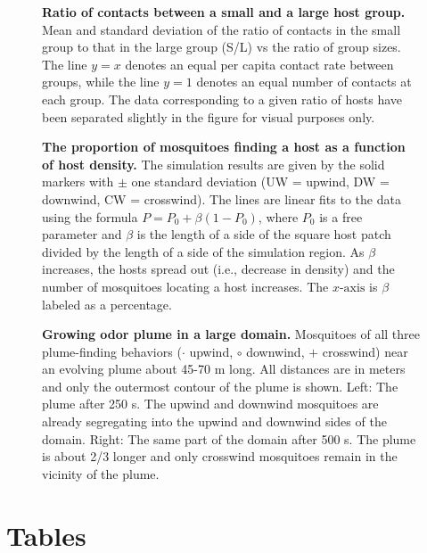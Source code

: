 \documentclass[10pt]{article}
\begin{document}
\begin{figure}[!htp]
\caption{
{\bf Ratio of contacts between a small and a large host group.} Mean and standard deviation of the ratio of contacts in the small group to that in the large group (S/L) vs the ratio of group sizes. The line $y=x$ denotes an equal per capita contact rate between groups, while the line $y=1$ denotes an equal number of contacts at each group. The data corresponding to a given ratio of hosts have been separated
	slightly in the figure for visual purposes only.}
	\label{fig:2groupsres}
\end{figure}

\begin{figure}[!htp]
\caption{
{\bf The proportion of mosquitoes finding a host as a function of host density.} The simulation results are given by the solid markers with $\pm$ one standard deviation (UW = upwind, DW = downwind, CW = crosswind). The lines are linear fits to the data using the formula $P = P_0 + \beta(1-P_0)$, where $P_0$ is a free parameter and $\beta$ is the length of a side of the square host patch divided by the length of a side of the simulation region. As $\beta$ increases, the hosts spread out (i.e., decrease in density) and the number of mosquitoes locating a host increases. The $x\mbox{-axis}$ is $\beta$ labeled as a percentage. }
	\label{fig:Density}
\end{figure}

\begin{figure}[!htp]
\caption{
{\bf Growing odor plume in a large domain.}  Mosquitoes of all three plume-finding behaviors ($\boldsymbol{\cdot}$ upwind, $\circ$ downwind, $+$ crosswind) near an evolving plume about 45-70 m long. All distances are in meters and only the outermost contour of the plume is shown. Left: The plume after 250 s. The upwind and downwind mosquitoes are already segregating into the upwind and downwind sides of the domain. Right: The same part of the domain after 500 s. The plume is about 2/3 longer and only crosswind mosquitoes remain in the vicinity of the plume. }
			\label{fig:bigdomain}
\end{figure}


\newpage
\newpage
\newpage
\section*{Tables}
		
\end{document}
